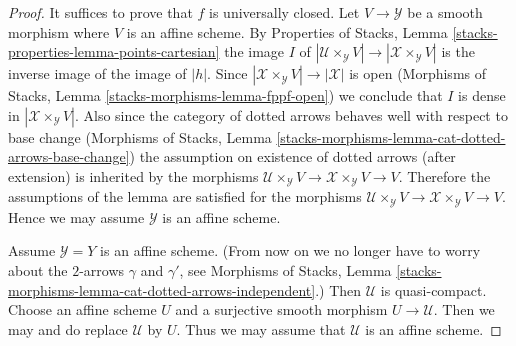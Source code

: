 \begin{proof}
It suffices to prove that $f$ is universally closed.
Let $V \to \mathcal{Y}$ be a smooth morphism where $V$ is an affine scheme.
By Properties of Stacks, Lemma
\ref{stacks-properties-lemma-points-cartesian}
the image $I$ of
$|\mathcal{U} \times_\mathcal{Y} V| \to |\mathcal{X} \times_\mathcal{Y} V|$
is the inverse image of the image of $|h|$. Since
$|\mathcal{X} \times_\mathcal{Y} V| \to |\mathcal{X}|$ is open
(Morphisms of Stacks, Lemma \ref{stacks-morphisms-lemma-fppf-open})
we conclude that $I$ is dense in $|\mathcal{X} \times_\mathcal{Y} V|$.
Also since the category of dotted arrows behaves well with respect
to base change (Morphisms of Stacks, Lemma
\ref{stacks-morphisms-lemma-cat-dotted-arrows-base-change})
the assumption on existence of dotted arrows (after extension)
is inherited by the morphisms
$\mathcal{U} \times_\mathcal{Y} V \to \mathcal{X} \times_\mathcal{Y} V \to V$.
Therefore the assumptions of the lemma are
satisfied for the morphisms
$\mathcal{U} \times_\mathcal{Y} V \to \mathcal{X} \times_\mathcal{Y} V \to V$.
Hence we may assume $\mathcal{Y}$ is an affine scheme.

\medskip\noindent
Assume $\mathcal{Y} = Y$ is an affine scheme.
(From now on we no longer have to worry about the
$2$-arrows $\gamma$ and $\gamma'$, see Morphisms of Stacks, Lemma
\ref{stacks-morphisms-lemma-cat-dotted-arrows-independent}.)
Then $\mathcal{U}$ is quasi-compact. Choose an affine scheme $U$ and a
surjective smooth morphism $U \to \mathcal{U}$.
Then we may and do replace $\mathcal{U}$ by $U$.
Thus we may assume that $\mathcal{U}$ is an affine scheme.


\end{proof}
